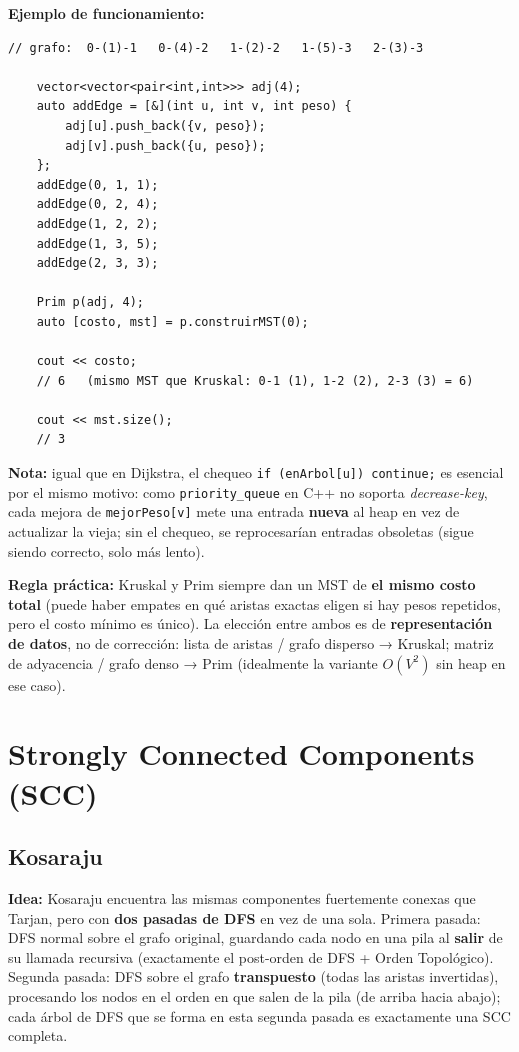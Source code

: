 \documentclass[10pt,a4paper,twocolumn]{article}
\begin{document}
\textbf{Ejemplo de funcionamiento:}

\begin{lstlisting}[style=cpp]
	// grafo:  0-(1)-1   0-(4)-2   1-(2)-2   1-(5)-3   2-(3)-3
	
	vector<vector<pair<int,int>>> adj(4);
	auto addEdge = [&](int u, int v, int peso) {
		adj[u].push_back({v, peso});
		adj[v].push_back({u, peso});
	};
	addEdge(0, 1, 1);
	addEdge(0, 2, 4);
	addEdge(1, 2, 2);
	addEdge(1, 3, 5);
	addEdge(2, 3, 3);
	
	Prim p(adj, 4);
	auto [costo, mst] = p.construirMST(0);
	
	cout << costo;
	// 6   (mismo MST que Kruskal: 0-1 (1), 1-2 (2), 2-3 (3) = 6)
	
	cout << mst.size();
	// 3
\end{lstlisting}

\textbf{Nota:} igual que en Dijkstra, el chequeo
\texttt{if (enArbol[u]) continue;} es esencial por el mismo motivo:
como \texttt{priority\_queue} en C++ no soporta \textit{decrease-key},
cada mejora de \texttt{mejorPeso[v]} mete una entrada \textbf{nueva}
al heap en vez de actualizar la vieja; sin el chequeo, se
reprocesarían entradas obsoletas (sigue siendo correcto, solo más
lento).

\textbf{Regla práctica:} Kruskal y Prim siempre dan un MST de
\textbf{el mismo costo total} (puede haber empates en qué aristas
exactas eligen si hay pesos repetidos, pero el costo mínimo es único).
La elección entre ambos es de \textbf{representación de datos}, no de
corrección: lista de aristas / grafo disperso → Kruskal; matriz de
adyacencia / grafo denso → Prim (idealmente la variante $O(V^2)$ sin
heap en ese caso).


\section{Strongly Connected Components (SCC)}
\subsection{Kosaraju}

\textbf{Idea:} Kosaraju encuentra las mismas componentes fuertemente
conexas que Tarjan, pero con \textbf{dos pasadas de DFS} en vez de
una sola. Primera pasada: DFS normal sobre el grafo original,
guardando cada nodo en una pila al \textbf{salir} de su llamada
recursiva (exactamente el post-orden de DFS + Orden Topológico).
Segunda pasada: DFS sobre el grafo \textbf{transpuesto} (todas las
aristas invertidas), procesando los nodos en el orden en que salen de
la pila (de arriba hacia abajo); cada árbol de DFS que se forma en
esta segunda pasada es exactamente una SCC completa.
\end{document}
